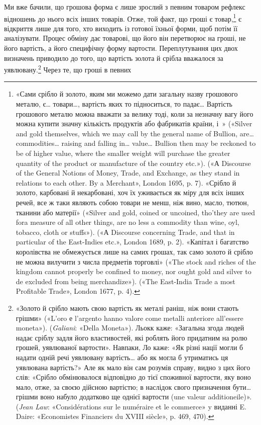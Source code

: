 Ми вже бачили, що грошова форма є лише зрослий з певним
товаром рефлекс відношень до нього всіх інших товарів. Отже,
той факт, що гроші є товар,\footnote{
«Сами срібло й золото, яким ми можемо дати загальну назву грошового
металю, є\dots{} товари\dots{}, вартість яких то підноситься, то падає\dots{}
Вартість грошового металю можна вважати за велику тоді, коли за
незначну вагу його можна купити значну кількість продуктів або фабрикатів
 країни, і~» («Silver and gold themselves, which we may call
by the general name of Bullion, are\dots{} commodities\dots{} raising and falling
in\dots{} value\dots{} Bullion then may be reckoned to be of higher value, where
the smaller weight will purchase the greater quantity of the product or
manufacture of the country etc.»). («А Discourse of the General Notions
of Money, Trade, and Exchange, as they stand in relations to each other.
By a Merchant», London 1695, p. 7). «Срібло й золото, карбовані й некарбовані,
хоч їх уживається як міру для всіх інших речей, все ж таки
являють собою товари не менш, ніж вино, масло, тютюн, тканини або матерії»
(«Silver and gold, coined or uncoined, tho’they are used fora measure
of all other things, are no less a commodity than wine, oyl, tobacco,
cloth or stuffs»). («А Discourse concerning Trade, and that in particular
of the East-Indies etc.», London 1689, p. 2). «Капітал і багатство королівства
не обмежується лише на самих грошах, так само золото й срібло
не можна вилучити з числа предметів торговлі» («The stock and riches
of the kingdom cannot properly be confined to money, nor ought gold and
silver to de excluded from being merchandize»). («The East-India Trade
a most Profitable Trade», London 1677, p. 4).
} є відкриття лише для того, хто
виходить із готової їхньої форми, щоб потім її аналізувати. Процес
обміну дає товарові, що його він перетворює на гроші, не його
вартість, а його специфічну форму вартости. Переплутування
цих двох визначень приводило до того, що вартість золота й
срібла вважалося за уявлювану.\footnote{
«Золото й срібло мають свою вартість як металі раніш, ніж вони
стають грішми» («L’oro е l’argento hanno valore come metalli anteriore
all’essere moneta»). (\emph{Galiani}: «Della Moneta»). Льокк каже: «Загальна
згода людей надає сріблу задля його властивостей, які роблять
його придатним на ролю грошей, уявлюваної вартости». Навпаки, Ло
каже: «Як різні нації могли б надати одній речі уявлювану вартість\dots{}
або як могла б утриматись ця уявлювана вартість?» Але як мало він сам
розумів справу, видно з цих його слів: «Срібло обмінювалося відповідно
до тієї споживної вартости, яку воно мало, отже, за своєю дійсною вартістю;
в наслідок свого призначення бути\dots{} грішми воно набуло додатково
ще однієї вартости (une valeur additioneile)». (\emph{Jean Law}: «Considérations
sur le numéraire et le commerce» y виданні E. Daire: «Economistes
Financiers du XVIII siècle», p. 469, 470).
} Через те, що гроші в певних
